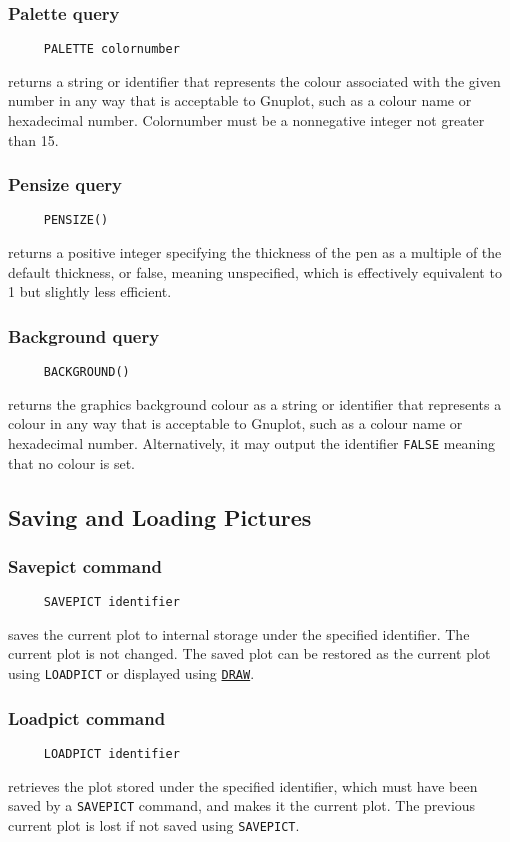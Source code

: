 \subsubsection*{Palette query}
\begin{verbatim}
     PALETTE colornumber
\end{verbatim}
returns a string or identifier that represents the colour associated
with the given number in any way that is acceptable to Gnuplot, such
as a colour name or hexadecimal number.  Colornumber must be a
nonnegative integer not greater than 15.

\subsubsection*{Pensize query}
\begin{verbatim}
     PENSIZE()
\end{verbatim}
returns a positive integer specifying the thickness of the pen as a
multiple of the default thickness, or false, meaning unspecified,
which is effectively equivalent to 1 but slightly less efficient.

\subsubsection*{Background query}
\begin{verbatim}
     BACKGROUND()
\end{verbatim}
returns the graphics background colour as a string or identifier that
represents a colour in any way that is acceptable to Gnuplot, such as
a colour name or hexadecimal number.  Alternatively, it may output the
identifier \texttt{FALSE} meaning that no colour is set.


\subsection{Saving and Loading Pictures}

\subsubsection*{Savepict command}
\begin{verbatim}
     SAVEPICT identifier
\end{verbatim}
\label{logoturtle:savepict}
saves the current plot to internal storage under the specified
identifier.  The current plot is not changed.  The saved plot can be
restored as the current plot using \texttt{LOADPICT} or displayed
using \hyperref[logoturtle:draw]{\texttt{DRAW}}.

\subsubsection*{Loadpict command}
\begin{verbatim}
     LOADPICT identifier
\end{verbatim}
retrieves the plot stored under the specified identifier, which must
have been saved by a \texttt{SAVEPICT} command, and makes it the
current plot.  The previous current plot is lost if not saved using
\texttt{SAVEPICT}.
